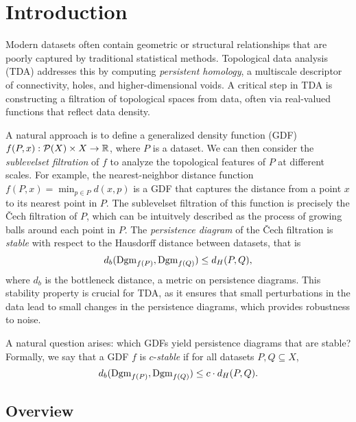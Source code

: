 \newcommand{\package}{\emph}

\chapter{Introduction}

Modern datasets often contain geometric or structural relationships that are
poorly captured by traditional statistical methods. Topological data analysis
(TDA) addresses this by computing \textit{persistent homology}, a multiscale
descriptor of connectivity, holes, and higher-dimensional voids. A critical step
in TDA is constructing a filtration of topological spaces from data, often via
real-valued functions that reflect data density.

A natural approach is to define a generalized density function (GDF)
$f(P, x) : \mathcal{P}(X) \times X \to \mathbb{R}$, where $P$ is a dataset.
We can then consider the \textit{sublevelset filtration} of $f$ to analyze the
topological features of $P$ at different scales.
For example, the nearest-neighbor distance function
$f(P, x) = \min_{p \in P} d(x, p)$ is a GDF that captures the distance from a
point $x$ to its nearest point in $P$. The sublevelset filtration of this
function is precisely the \v{C}ech filtration of $P$, which can be intuitvely
described as the process of growing balls around each point in $P$.
The \textit{persistence diagram} of the \v{C}ech filtration is \textit{stable}
with respect to the Hausdorff distance between datasets, that is
\begin{equation}
    d_b(\operatorname{Dgm}_{f(P)}, \operatorname{Dgm}_{f(Q)}) \leq d_H(P, Q),
\end{equation}
where $d_b$ is the bottleneck distance, a metric on persistence diagrams.
This stability property is crucial for TDA, as it ensures that small
perturbations in the data lead to small changes in the persistence diagrams,
which provides robustness to noise.

A natural question arises: which GDFs yield persistence diagrams that are stable?
Formally, we say that a GDF $f$ is $c$-\textit{stable} if for all datasets
$P, Q \subseteq X$,
\begin{equation}
    d_b(\operatorname{Dgm}_{f(P)}, \operatorname{Dgm}_{f(Q)}) \leq c \cdot d_H(P, Q).
\end{equation}

\section{Overview}

\todo{}
